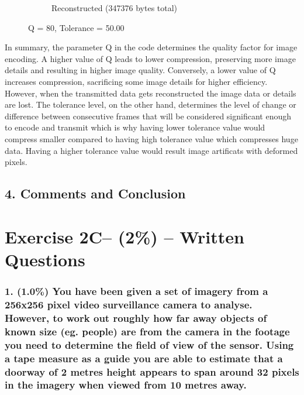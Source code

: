 \documentclass{article}
\begin{document}
\begin{figure}[ht]
\begin{subfigure}[t]{0.45\textwidth}
			\caption{Reconstructed (347376 bytes total)}
			\label{fig:2B_Tolerance50Reconstructed}

		\end{subfigure}

		\caption{Q = 80, Tolerance = 50.00}
		\label{fig:2B_Tolerance50}
	\end{figure}

	In summary, the parameter Q in the code determines the quality factor for image encoding. A higher value of Q leads to lower compression, preserving more image details and resulting in 
	higher image quality. Conversely, a lower value of Q increases compression, sacrificing some image details for higher efficiency. However, when the transmitted data gets reconstructed 
	the image data or details are lost. The tolerance level, on the other hand, determines the level of change or difference between consecutive frames that will be considered significant 
	enough to encode and transmit which is why having lower tolerance value would compress smaller compared to having high tolerance value which compresses huge data. Having a higher tolerance
	value would result image artificats with deformed pixels.


	\subsection*{4. Comments and Conclusion}



	\newpage
	\section*{Exercise 2C– (2\%) – Written Questions }
	
	\subsubsection*{1. (1.0\%) You have been given a set of imagery from a 256x256 pixel video surveillance camera to analyse. However, to work out roughly how far away objects of known size (eg. people) are from the camera in the footage you need to determine the field of view of the sensor. Using a tape measure as a guide you are able to estimate that a doorway of 2 metres height appears to span around 32 pixels in the imagery when viewed from 10 metres away.}
	
\end{document}
